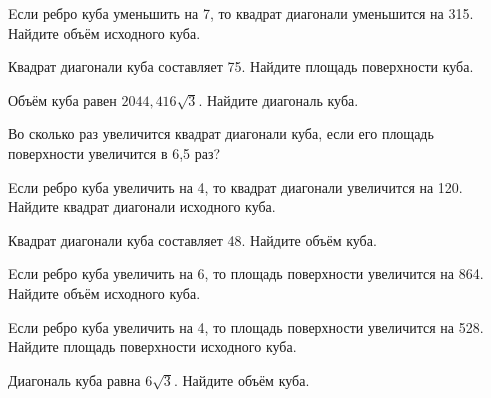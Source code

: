 \begin{taskBN}{47}
Eсли ребро куба уменьшить на 7, то квадрат диагонали уменьшится на 315. Найдите объём исходного куба.
\end{taskBN}

\begin{taskBN}{48}
Квадрат диагонали куба составляет 75. Найдите площадь поверхности куба.
\end{taskBN}

\begin{taskBN}{49}
Объём куба равен $2044,416\sqrt{3}$. Найдите диагональ куба.
\end{taskBN}

\begin{taskBN}{50}
Во сколько раз увеличится квадрат диагонали куба, если его площадь поверхности увеличится в 6,5 раз?
\end{taskBN}

\begin{taskBN}{51}
Eсли ребро куба увеличить на 4, то квадрат диагонали увеличится на 120. Найдите квадрат диагонали исходного куба.
\end{taskBN}

\begin{taskBN}{52}
Квадрат диагонали куба составляет 48. Найдите объём куба.
\end{taskBN}

\begin{taskBN}{53}
Eсли ребро куба увеличить на 6, то площадь поверхности увеличится на 864. Найдите объём исходного куба.
\end{taskBN}

\begin{taskBN}{54}
Eсли ребро куба увеличить на 4, то площадь поверхности увеличится на 528. Найдите площадь поверхности исходного куба.
\end{taskBN}

\begin{taskBN}{55}
Диагональ куба равна $6\sqrt{3}$. Найдите объём куба.
\end{taskBN}

